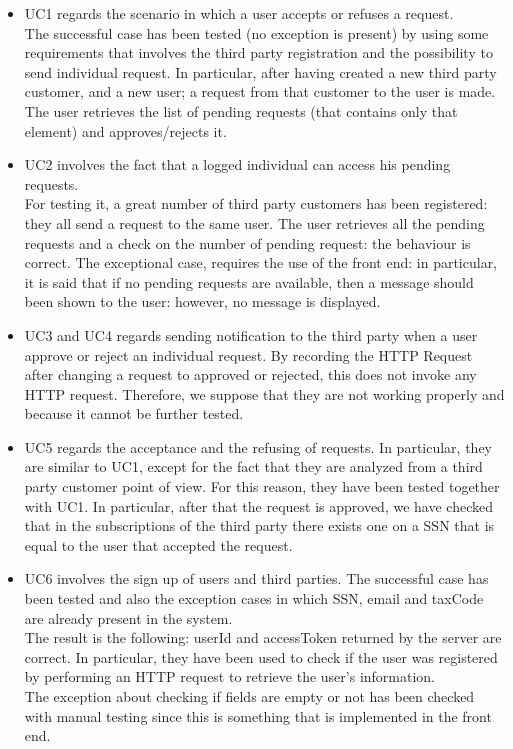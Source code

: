 \begin{itemize}
\item 
UC1 regards the scenario in which a user accepts or refuses a request. \\
The successful case has been tested (no exception is present) by using some requirements that involves the
third party registration and the possibility to send individual request. In particular, after having created a new third party customer,
and a new user; a request from that customer to the user is made. The user retrieves the list of pending requests (that contains only that
element) and approves/rejects it.

\item 
UC2 involves the fact that a logged individual can access his pending requests. \\
For testing it, a great number of third party customers has been registered: they all send a request to the same user.
The user retrieves all the pending requests and a check on the number of pending request: the behaviour is correct.
The exceptional case, requires the use of the front end: in particular, it is said that if no pending requests are available, then a message
should been shown to the user: however, no message is displayed.

\item 
UC3 and UC4 regards sending notification to the third party when a user approve or reject an individual request. By recording the HTTP Request after changing a request to approved or rejected, this does not invoke any HTTP request. Therefore, we suppose that they are not working properly and because it cannot be further tested.

\item 
UC5 regards the acceptance and the refusing of requests. In particular, they are similar to UC1, except for the fact
that they are analyzed from a third party customer point of view. For this reason, they have been tested together with UC1. 
In particular, after that the request is approved, we have checked that in the subscriptions
of the third party there exists one on a SSN that is equal to the user that accepted the request.

\item UC6 involves the sign up of users and third parties. The successful case has been tested and also the exception cases in which SSN, email and taxCode
are already present in the system. \\
The result is the following: userId and accessToken returned by the server are correct. In particular, they have been used to check
if the user was registered by performing an HTTP request to retrieve the user's information.  \\
The exception about checking if fields are empty or not has been checked with manual testing since this is something that is implemented in the front
end.


\end{itemize}
